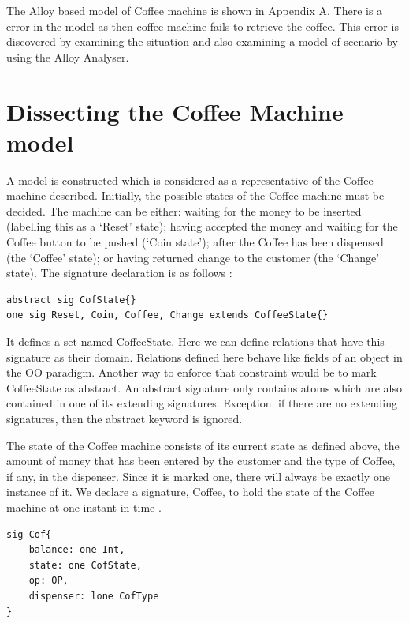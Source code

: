 \documentclass[a4paper,10pt]{report}
\begin{document}
The Alloy based model of Coffee machine is shown in Appendix A. There is a error in the model as then coffee machine fails to retrieve the coffee. This error is discovered by examining the situation and also examining a model of scenario by using the Alloy Analyser. 

\section{Dissecting the Coffee Machine model}
\label{Dissecting Cooffee machine}

A model is constructed which is considered as a representative of the Coffee machine described. Initially, the possible states of the Coffee machine must be decided. The machine can be either: waiting for the money to be inserted (labelling this as a `Reset’ state); having accepted the money and waiting for the Coffee button to be pushed (`Coin state’); after the Coffee has been dispensed (the ‘Coffee’ state); or having returned change to the customer (the `Change’ state). The signature declaration is as follows \cite{Boyatt}:

\begin{verbatim}
abstract sig CofState{}
one sig Reset, Coin, Coffee, Change extends CoffeeState{}
\end{verbatim}

 It defines a set named CoffeeState. Here we can define relations that have this signature as their domain. Relations defined here behave like fields of an object in the OO paradigm. Another way to enforce that constraint would be to mark CoffeeState as abstract. An abstract signature only contains atoms which are also contained in one of its extending signatures. Exception: if there are no extending signatures, then the abstract keyword is ignored.

The state of the Coffee machine consists of its current state as defined above, the amount of money that has been entered by the customer and the type of Coffee, if any, in the dispenser. Since it is marked one, there will always be exactly one instance of it. We declare a signature, Coffee, to hold the state of the Coffee machine at one instant in time \cite{Boyatt}.

\begin{verbatim}
sig Cof{
	balance: one Int,
	state: one CofState,
	op: OP,
	dispenser: lone CofType
}
\end{verbatim}
\end{document}
